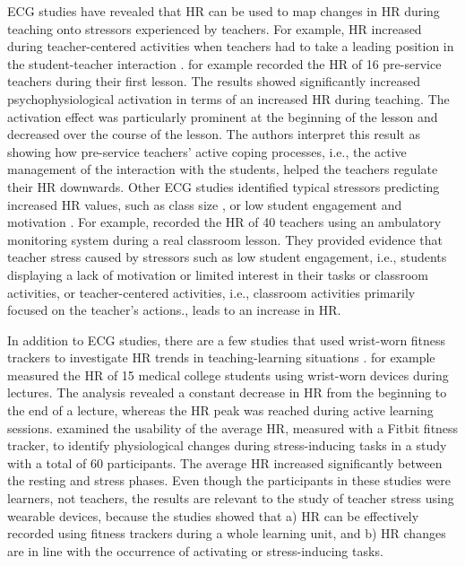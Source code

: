 \documentclass[]{elsarticle} %
\begin{document}
ECG studies have revealed that HR can be used to map changes in HR
during teaching onto stressors experienced by teachers. For example, HR
increased during teacher-centered activities when teachers had to take a
leading position in the student-teacher interaction
\citep{sperka1995, scheuch1997psychophysische, donker2018, junker2021}.
\citet{sperka1995} for example recorded the HR of 16 pre-service
teachers during their first lesson. The results showed significantly
increased psychophysiological activation in terms of an increased HR
during teaching. The activation effect was particularly prominent at the
beginning of the lesson and decreased over the course of the lesson. The
authors interpret this result as showing how pre-service teachers'
active coping processes, i.e., the active management of the interaction
with the students, helped the teachers regulate their HR downwards.
Other ECG studies identified typical stressors predicting increased HR
values, such as class size \citep{huang2022class}, or low student
engagement and motivation \citep{junker2021}. For example,
\citet{junker2021} recorded the HR of 40 teachers using an ambulatory
monitoring system during a real classroom lesson. They provided evidence
that teacher stress caused by stressors such as low student engagement,
i.e., students displaying a lack of motivation or limited interest in
their tasks or classroom activities, or teacher-centered activities,
i.e., classroom activities primarily focused on the teacher's actions.,
leads to an increase in HR.

In addition to ECG studies, there are a few studies that used wrist-worn
fitness trackers to investigate HR trends in teaching-learning
situations \citep{Darnell2019, chalmers2021}. \citet{Darnell2019} for
example measured the HR of 15 medical college students using wrist-worn
devices during lectures. The analysis revealed a constant decrease in HR
from the beginning to the end of a lecture, whereas the HR peak was
reached during active learning sessions. \citet{chalmers2021} examined
the usability of the average HR, measured with a Fitbit fitness tracker,
to identify physiological changes during stress-inducing tasks in a
study with a total of 60 participants. The average HR increased
significantly between the resting and stress phases. Even though the
participants in these studies were learners, not teachers, the results
are relevant to the study of teacher stress using wearable devices,
because the studies showed that a) HR can be effectively recorded using
fitness trackers during a whole learning unit, and b) HR changes are in
line with the occurrence of activating or stress-inducing tasks.
\end{document}
